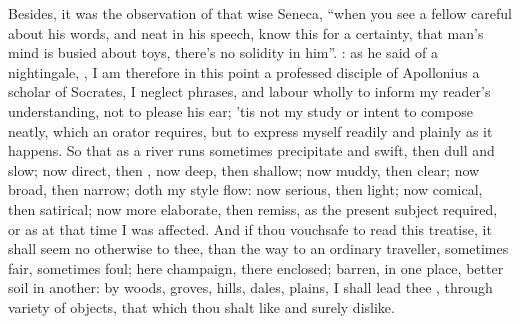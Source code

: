 
Besides, it was the observation of that wise Seneca, \enquote{when
you see a fellow careful about his words, and neat in his speech, know this for
a certainty, that man's mind is busied about toys, there's no solidity in him}.
: as he said of a nightingale,
, \etc{} I am therefore in this point a
professed disciple of Apollonius a scholar of Socrates, I
neglect phrases, and labour wholly to inform my reader's understanding, not to
please his ear; 'tis not my study or intent to compose neatly, which an orator
requires, but to express myself readily and plainly as it happens. So that as a
river runs sometimes precipitate and swift, then dull and slow; now direct,
then , now deep, then shallow; now muddy, then clear; now
broad, then narrow; doth my style flow: now serious, then light; now comical,
then satirical; now more elaborate, then remiss, as the present subject
required, or as at that time I was affected. And if thou vouchsafe to read this
treatise, it shall seem no otherwise to thee, than the way to an ordinary
traveller, sometimes fair, sometimes foul; here champaign, there enclosed;
barren, in one place, better soil in another: by woods, groves, hills, dales,
plains, \etc{} I shall lead thee , through variety of
objects, that which thou shalt like and surely dislike.

